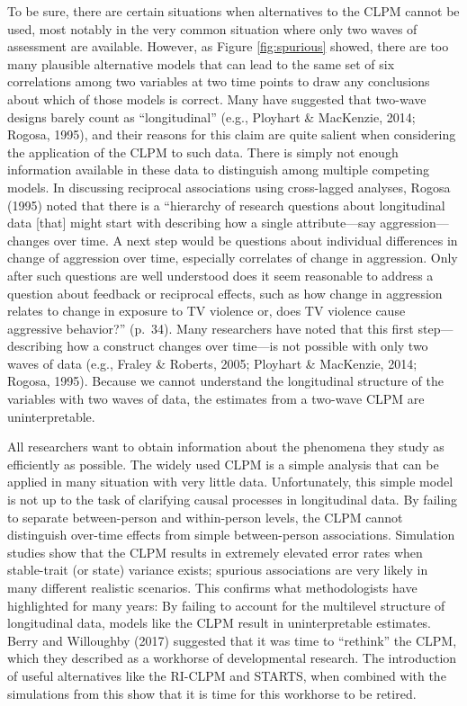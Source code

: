 \documentclass[
  english,
  man,floatsintext]{apa6}
\begin{document}
To be sure, there are certain situations when alternatives to the CLPM cannot be used, most notably in the very common situation where only two waves of assessment are available. However, as Figure \ref{fig:spurious} showed, there are too many plausible alternative models that can lead to the same set of six correlations among two variables at two time points to draw any conclusions about which of those models is correct. Many have suggested that two-wave designs barely count as ``longitudinal'' (e.g., Ployhart \& MacKenzie, 2014; Rogosa, 1995), and their reasons for this claim are quite salient when considering the application of the CLPM to such data. There is simply not enough information available in these data to distinguish among multiple competing models. In discussing reciprocal associations using cross-lagged analyses, Rogosa (1995) noted that there is a ``hierarchy of research questions about longitudinal data {[}that{]} might start with describing how a single attribute---say aggression---changes over time. A next step would be questions about individual differences in change of aggression over time, especially correlates of change in aggression. Only after such questions are well understood does it seem reasonable to address a question about feedback or reciprocal effects, such as how change in aggression relates to change in exposure to TV violence or, does TV violence cause aggressive behavior?'' (p.~34). Many researchers have noted that this first step---describing how a construct changes over time---is not possible with only two waves of data (e.g., Fraley \& Roberts, 2005; Ployhart \& MacKenzie, 2014; Rogosa, 1995). Because we cannot understand the longitudinal structure of the variables with two waves of data, the estimates from a two-wave CLPM are uninterpretable.

All researchers want to obtain information about the phenomena they study as efficiently as possible. The widely used CLPM is a simple analysis that can be applied in many situation with very little data. Unfortunately, this simple model is not up to the task of clarifying causal processes in longitudinal data. By failing to separate between-person and within-person levels, the CLPM cannot distinguish over-time effects from simple between-person associations. Simulation studies show that the CLPM results in extremely elevated error rates when stable-trait (or state) variance exists; spurious associations are very likely in many different realistic scenarios. This confirms what methodologists have highlighted for many years: By failing to account for the multilevel structure of longitudinal data, models like the CLPM result in uninterpretable estimates. Berry and Willoughby (2017) suggested that it was time to ``rethink'' the CLPM, which they described as a workhorse of developmental research. The introduction of useful alternatives like the RI-CLPM and STARTS, when combined with the simulations from this show that it is time for this workhorse to be retired.
\end{document}
